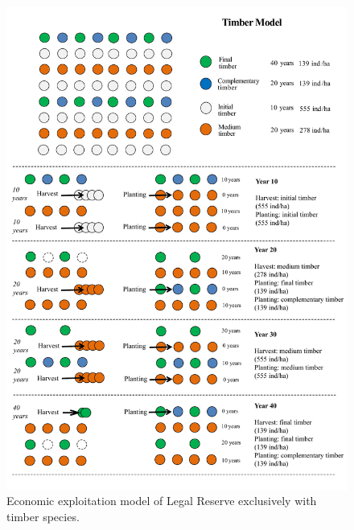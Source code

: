  
 \begin{figure}
\centering
\includegraphics[width=\textwidth]{pictureve/socio-modelomadeira.pdf}
\caption{Economic exploitation model of Legal Reserve exclusively with timber species. }
\label{fig:modelmadeira}
\end{figure}


